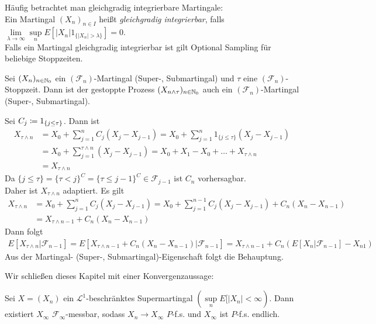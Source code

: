 \documentclass[a4paper,twoside,DIV15,BCOR12mm]{scrbook}
\newcommand{\cF}{\mathcal F}
\begin{document}
\begin{bemerkung}
Häufig betrachtet man gleichgradig integrierbare Martingale:\\
Ein Martingal $(X_n)_{n\in I}$ heißt \textit{gleichgradig integrierbar}, falls $\lim\limits_{\lambda\to\infty}\sup\limits_n E[|X_n| 1_{\{|X_n|>\lambda\}}]=0$.\\
Falls ein Martingal gleichgradig integrierbar ist gilt Optional Sampling für beliebige Stoppzeiten.
\end{bemerkung}

\begin{satz}
\label{satz:2.1.35}Sei $(X_n)_{n\in\mathbb{N}_0}$ ein $(\cF_n)$-Martingal (Super-, Submartingal) und $\tau$ eine $(\cF_n)$-Stoppzeit. Dann ist der gestoppte Prozess $(X_{n\wedge\tau})_{n\in\mathbb{N}_0}$ auch ein $(\cF_n)$-Martingal (Super-, Submartingal).
\end{satz}
\begin{beweis}
Sei $C_j\da 1_{\{j\leq \tau\}}$. Dann ist
\begin{align*}
X_{\tau\wedge n}&=X_0+\sum\limits_{j=1}^n C_j (X_j-X_{j-1})=X_0+\sum\limits_{j=1}^n1_{\{j\leq\tau\}}(X_j-X_{j-1})\\
&=X_0+\sum\limits_{j=1}^{\tau\wedge n}(X_j-X_{j-1})=X_0+X_1-X_0+\ldots+X_{\tau\wedge n}\\
&= X_{\tau\wedge n}
\end{align*}
Da $\{j\leq\tau\}=\{\tau<j\}^C=\{\tau\leq j-1\}^C \in \cF_{j-1}$ ist $C_n$ vorhersagbar.\\
Daher ist $X_{\tau\wedge n}$ adaptiert. Es gilt
\begin{align*}
X_{\tau\wedge n}&=X_0+\sum\limits_{j=1}^n C_j (X_j-X_{j-1})=X_0+\sum\limits_{j=1}^{n-1}C_j(X_j-X_{j-1})+C_n(X_n-X_{n-1})\\
&= X_{\tau\wedge n-1}+C_n(X_n-X_{n-1})
\end{align*}
Dann folgt 
\begin{align*}
E[X_{\tau\wedge n}|\cF_{n-1}]=E[X_{\tau\wedge n-1}+C_n(X_n-X_{n-1})|\cF_{n-1}]=X_{\tau\wedge n-1}+C_n(E[X_n|\cF_{n-1}]-X_{n1})
\end{align*}
Aus der Martingal- (Super-, Submartingal)-Eigenschaft folgt die Behauptung.
\end{beweis}
Wir schließen dieses Kapitel mit einer Konvergenzaussage:
\begin{satz}Sei $X=(X_n)$ ein $\mathcal{L}^1$-beschränktes Supermartingal $(\sup\limits_n E[|X_n|<\infty)$. Dann existiert $X_\infty$ $\cF_\infty$-messbar, sodass $X_n\to X_\infty$ $P$-f.s. und $X_\infty$ ist $P$-f.s. endlich.
\end{satz}
\end{document}
